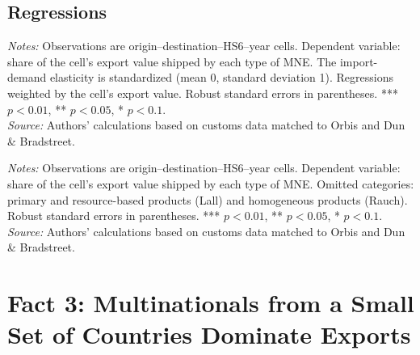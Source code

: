 \documentclass[11pt,a4paper]{article}
\begin{document}
\subsection{Regressions}
\begin{table}[H]\centering\small%
  \caption{Product Characteristics and Multinational Shares}%
  \label{tab:fgo_r_all}%
  \par\vspace{3pt}%
  \begin{minipage}{0.95\textwidth}\footnotesize %
  \textit{Notes:} Observations are origin--destination--HS6--year cells. Dependent variable: share of the cell's export value shipped by each type of MNE. The import-demand elasticity is standardized (mean 0, standard deviation 1). Regressions weighted by the cell's export value. Robust standard errors in parentheses. *** $p<0.01$, ** $p<0.05$, * $p<0.1$.\\[3pt]%
  \textit{Source:} Authors' calculations based on customs data matched to Orbis and Dun \& Bradstreet.%
  \end{minipage}%
  \end{table}
\begin{table}[H]\centering\footnotesize%
  \caption{Product Sophistication and Multinational Shares}%
  \label{tab:meas_r_all}%
  \par\vspace{3pt}%
  \begin{minipage}{0.95\textwidth}\footnotesize %
  \textit{Notes:} Observations are origin--destination--HS6--year cells. Dependent variable: share of the cell's export value shipped by each type of MNE. Omitted categories: primary and resource-based products (Lall) and homogeneous products (Rauch). Robust standard errors in parentheses. *** $p<0.01$, ** $p<0.05$, * $p<0.1$.\\[3pt]%
  \textit{Source:} Authors' calculations based on customs data matched to Orbis and Dun \& Bradstreet.%
  \end{minipage}%
  \end{table}

\section{Fact 3: Multinationals from a Small Set of Countries Dominate Exports}\label{sec:f3_all}
\end{document}
